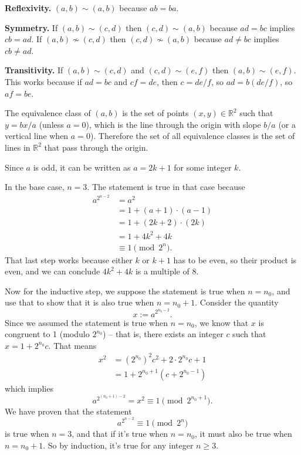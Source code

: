 \documentclass[12pt]{article}
\begin{document}
\textbf{Reflexivity.} $(a, b) \sim (a, b)$ because $ab=ba$.
\par
\textbf{Symmetry.} If $(a,b) \sim (c,d)$ then $(c,d) \sim (a,b)$ because $ad=bc$ implies $cb=ad$. If $(a,b) \not\sim (c,d)$ then $(c,d) \not\sim (a,b)$ because $ad \neq bc$ implies $cb \neq ad$.
\par
\textbf{Transitivity.} If $(a,b) \sim (c,d)$ and $(c,d) \sim (e,f)$ then $(a,b) \sim (e,f)$. This works because if $ad=bc$ and $cf=de$, then $c=de/f$, so $ad=b(de/f)$, so $af=be$.
\bigskip
\par
The equivalence class of $(a,b)$ is the set of points $(x,y) \in \mathbb{R}^2$ such that $y = bx/a$ (unless $a=0$), which is the line through the origin with slope $b/a$ (or a vertical line when $a=0$). Therefore the set of all equivalence classes is the set of lines in $\mathbb{R}^2$ that pass through the origin.

\bigskip
\noindent{}\bigskip

Since $a$ is odd, it can be written as $a=2k+1$ for some integer $k$.
\par
In the base case, $n=3$. The statement is true in that case because
\begin{align*}
    a^{2^{n-2}} &= a^2 \\
                &= 1 + (a+1)\cdot (a-1) \\
                &= 1 + (2k+2) \cdot (2k) \\
                &= 1 + 4k^2 + 4k \\
                &\equiv 1 \pmod{2^n}.
\end{align*}
That last step works because either $k$ or $k+1$ has to be even, so their product is even, and we can conclude $4k^2+4k$ is a multiple of 8.
\par
Now for the inductive step, we suppose the statement is true when $n=n_0$, and use that to show that it is also true when $n=n_0+1$. Consider the quantity
\[ x := a^{2^{n_0-2}}. \]
Since we assumed the statement is true when $n=n_0$, we know that $x$ is congruent to 1 (modulo $2^{n_0}$) -- that is, there exists an integer $c$ such that $x=1+2^{n_0}c$. That means
\begin{align*}
x^2 &= (2^{n_0})^2c^2 + 2 \cdot 2^{n_0} c + 1 \\
    &= 1 + 2^{n_0+1} (c + 2^{n_0-1})
\end{align*}
which implies
\[ a^{2^{(n_0+1)-2}} = x^2 \equiv 1 \pmod{2^{n_0+1}}. \]
We have proven that the statement
\[ a^{2^{n-2}} \equiv 1 \pmod{2^n} \]
is true when $n=3$, and that if it's true when $n=n_0$, it must also be true when $n=n_0+1$. So by induction, it's true for any integer $n\geq3$.
\end{document}
